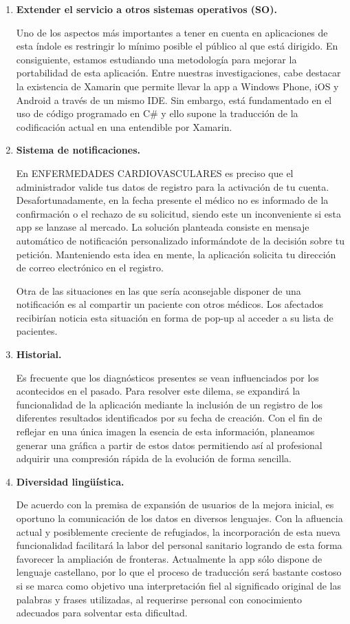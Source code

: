 \documentclass[11pt,spanish,
		listoftables,listoffigures]
		{tfgplantilla}
\begin{document}
\begin{enumerate}
	\item \textbf {Extender el servicio a otros sistemas operativos (SO).}

Uno de los aspectos más importantes a tener en cuenta en aplicaciones de esta índole es restringir lo mínimo posible el público al que está dirigido. En consiguiente, estamos estudiando una metodología para mejorar la portabilidad de esta aplicación. Entre nuestras investigaciones, cabe destacar la existencia de Xamarin que permite llevar la app a Windows Phone, iOS y Android a través de un mismo IDE. Sin embargo, está fundamentado en el uso de código programado en C\# y ello supone la traducción de la codificación actual en una entendible por Xamarin.

	\item \textbf {Sistema de notificaciones.} 

En \MakeUppercase{Enfermedades Cardiovasculares} es preciso que el administrador valide tus datos de registro para la activación de tu cuenta. Desafortunadamente, en la fecha presente el médico no es informado de la confirmación o el rechazo de su solicitud, siendo este un inconveniente si esta app se lanzase al mercado. La solución planteada consiste en mensaje automático de notificación personalizado informándote de la decisión sobre tu petición. Manteniendo esta idea en mente, la aplicación solicita tu dirección de correo electrónico en el registro. 

Otra de las situaciones en las que sería aconsejable disponer de una notificación es al compartir un paciente con otros médicos. Los afectados recibirían noticia esta situación en forma de pop-up al acceder a su lista de pacientes.

	\item \textbf {Historial.}

Es frecuente que los diagnósticos presentes se vean influenciados por los acontecidos en el pasado. Para resolver este dilema, se expandirá la funcionalidad de la aplicación mediante la inclusión de un registro de los diferentes resultados identificados por su fecha de creación. Con el fin de reflejar en una única imagen la esencia de esta información, planeamos generar una gráfica a partir de estos datos permitiendo así al profesional adquirir una compresión rápida de la evolución de forma sencilla.

	\item \textbf {Diversidad lingüística.}

De acuerdo con la premisa de expansión de usuarios de la mejora inicial, es oportuno la comunicación de los datos en diversos lenguajes. Con la afluencia actual y posiblemente creciente de refugiados, la incorporación de esta nueva funcionalidad facilitará la labor del personal sanitario logrando de esta forma favorecer la ampliación de fronteras. Actualmente la app sólo dispone de lenguaje castellano, por lo que el proceso de traducción será bastante costoso si se marca como objetivo una interpretación fiel al significado original de las palabras y frases utilizadas, al requerirse personal con conocimiento adecuados para solventar esta dificultad.


\end{enumerate}
\end{document}
